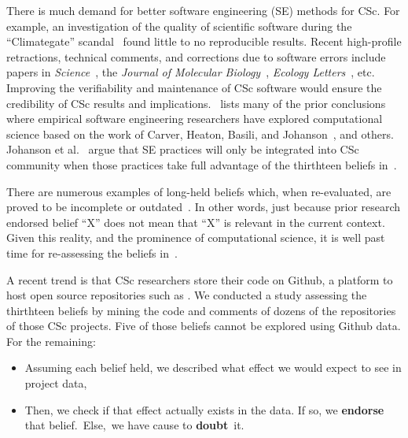 \documentclass[conference,10pt]{IEEEtran}
\newcommand{\bi}{\begin{itemize}}
\newcommand{\ei}{\end{itemize}}
\begin{document}

There is much demand for better software engineering (SE) methods
for CSc. For example, an investigation of the 
quality of scientific software during the ``Climategate'' scandal~\cite{merali10_error} found little to no reproducible results. Recent high-profile retractions, technical comments, and corrections
due to software errors include papers in \textit{Science}~\cite{Chang1875_science, comments_science}, the \textit{Journal of Molecular Biology}~\cite{Geoffrey_JMB}, \textit{Ecology Letters}~\cite{lee_ecolet, david_ecolet}, etc. Improving the verifiability and maintenance of CSc software would ensure the credibility of CSc results and implications.~
lists many of the prior conclusions
where empirical software
engineering researchers have explored computational science  based on the work of
Carver, Heaton, Basili, and Johanson~\cite{carver13_perception, carver07_environment, basili08_hpc, heaton15_lit, johan18_secs}, and others.
Johanson et al.~\cite{johan18_secs}   argue that SE practices will only be integrated into CSc community when
those practices take full advantage of
the   thirthteen beliefs  in~. 
 



There are numerous examples of long-held beliefs which, when re-evaluated, are proved to be incomplete or outdated~\cite{menzies17,dev16}. In other words, just because  prior research endorsed
 belief ``X'' does not mean that ``X'' is relevant in the current context. Given this reality, and the prominence of 
computational science, it is 
well past time for re-assessing the beliefs in~. 

A recent trend is that CSc researchers store their code on Github, a platform to host open source repositories such as  \cite{kendall05_C, BangerthHartmannKanschat2007, lammps-sandia, deelman-fgcs-2015}.
We conducted a study assessing the thirthteen beliefs by mining the code and comments of dozens of the repositories of  those CSc projects. Five of those beliefs cannot be explored using Github data. For the remaining:
\bi
\item Assuming each belief held,
we described what effect we would expect to see in project data,
\item Then, we check if that effect actually exists in the data.
If so,\hspace{-1pt} we \textbf{endorse} that belief.~Else,~we have cause to  \textbf{doubt}~it. 
\ei
\end{document}
